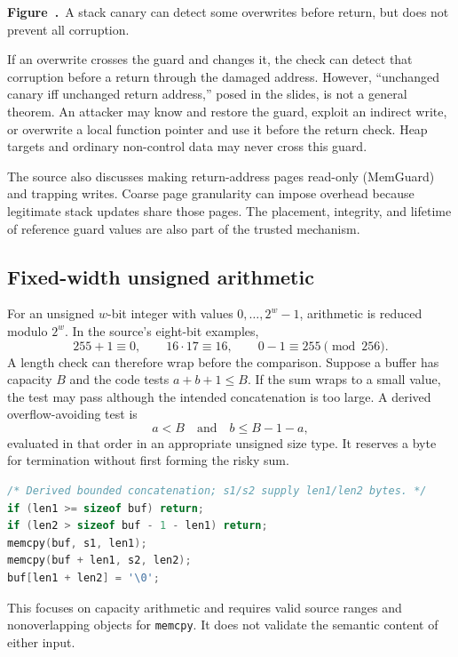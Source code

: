 \documentclass[11pt,a4paper]{article}
\numberwithin{figure}{section}
\newcommand{\diagramcaption}[1]{\par\smallskip\refstepcounter{figure}\begin{center}\small\textbf{Figure~\thefigure.}~#1\end{center}}
\begin{document}
\begin{center}\end{center}
\diagramcaption{A stack canary can detect some overwrites before return, but does not prevent all corruption.}

If an overwrite crosses the guard and changes it, the check can detect that corruption before a return through the damaged address. However, ``unchanged canary iff unchanged return address,'' posed in the slides, is not a general theorem. An attacker may know and restore the guard, exploit an indirect write, or overwrite a local function pointer and use it before the return check. Heap targets and ordinary non-control data may never cross this guard.

The source also discusses making return-address pages read-only (MemGuard) and trapping writes. Coarse page granularity can impose overhead because legitimate stack updates share those pages. The placement, integrity, and lifetime of reference guard values are also part of the trusted mechanism.

\subsection{Fixed-width unsigned arithmetic}
For an unsigned $w$-bit integer with values $0,\ldots,2^w-1$, arithmetic is reduced modulo $2^w$. In the source's eight-bit examples,
\[
255+1\equiv0,\qquad16\cdot17\equiv16,\qquad0-1\equiv255\pmod{256}.
\]
A length check can therefore wrap before the comparison. Suppose a buffer has capacity $B$ and the code tests $a+b+1\le B$. If the sum wraps to a small value, the test may pass although the intended concatenation is too large. A derived overflow-avoiding test is
\[
a<B\quad\text{and}\quad b\le B-1-a,
\]
evaluated in that order in an appropriate unsigned size type. It reserves a byte for termination without first forming the risky sum.

\begin{lstlisting}[language=C]
/* Derived bounded concatenation; s1/s2 supply len1/len2 bytes. */
if (len1 >= sizeof buf) return;
if (len2 > sizeof buf - 1 - len1) return;
memcpy(buf, s1, len1);
memcpy(buf + len1, s2, len2);
buf[len1 + len2] = '\0';
\end{lstlisting}
This focuses on capacity arithmetic and requires valid source ranges and nonoverlapping objects for \texttt{memcpy}. It does not validate the semantic content of either input.
\end{document}
